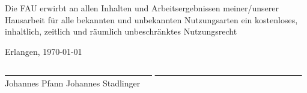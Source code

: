 Die FAU erwirbt an allen Inhalten und Arbeitsergebnissen meiner/unserer
Hausarbeit f\"ur alle bekannten und unbekannten Nutzungsarten ein kostenloses,
inhaltlich, zeitlich und r\"aumlich unbeschr\"anktes Nutzungsrecht


\vspace{2em}

\noindent
Erlangen, \today


\vspace{2em}
\noindent\underline{\ \ \ \ \ \ \ \ \ \ \ \ \ \ \ \ \ \ \ \ \ \ \ \ \
	\ \ \ \ \ \ \ \ \ \
} \hfill \underline{\ \ \ \ \ \ \ \ \ \ \ \ \ \ \ \ \ \ \ \ \ \ \ \ \
	\ \ \ \ \ \ \ \ \ \
}\\
\noindent\small{Johannes Pfann} \hfill
\small{Johannes Stadlinger}
